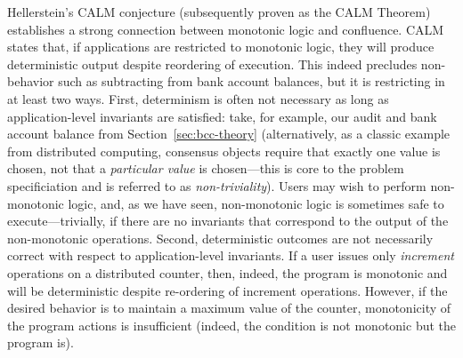  Hellerstein's CALM conjecture (subsequently
proven as the CALM Theorem) establishes a strong connection between
monotonic logic and confluence. CALM states that, if applications are
restricted to monotonic logic, they will produce deterministic output
despite reordering of execution. This indeed precludes non-\iconfluent
behavior such as subtracting from bank account balances, but it is
restricting in at least two ways. First, determinism is often not
necessary as long as application-level invariants are satisfied: take,
for example, our audit and bank account balance from
Section~\ref{sec:bcc-theory} (alternatively, as a classic example from
distributed computing, consensus objects require that exactly one
value is chosen, not that a \textit{particular value} is chosen---this
is core to the problem specificiation and is referred to as
\textit{non-triviality}). Users may wish to perform non-monotonic
logic, and, as we have seen, non-monotonic logic is sometimes safe to
execute---trivially, if there are no invariants that correspond to the
output of the non-monotonic operations. Second, deterministic outcomes
are not necessarily correct with respect to application-level
invariants. If a user issues only \textit{increment} operations on a
distributed counter, then, indeed, the program is monotonic and will
be deterministic despite re-ordering of increment operations. However,
if the desired behavior is to maintain a maximum value of the counter,
monotonicity of the program actions is insufficient (indeed, the
condition is not monotonic but the program is).
